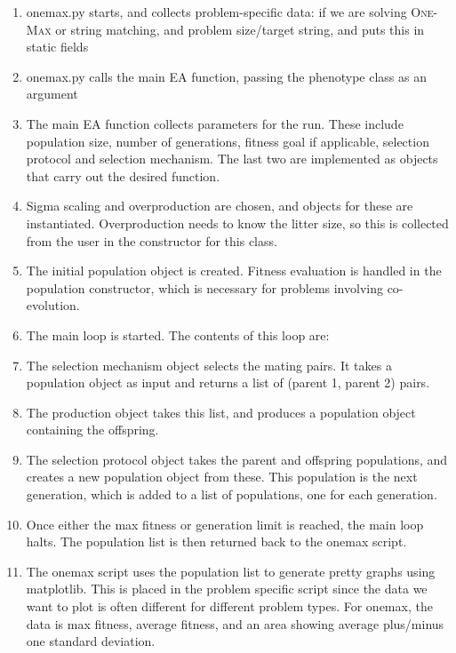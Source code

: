 \documentclass[a4paper,12pt]{article}
\begin{document}
\begin{enumerate}
\item{onemax.py starts, and collects problem-specific data: if we are solving \textsc{One-Max} or string matching, and problem size/target string, and puts this in static fields}
\item{onemax.py calls the main EA function, passing the phenotype class as an argument}
\item{The main EA function collects parameters for the run. These include population size, number of generations, fitness goal if applicable, selection protocol and selection mechanism. The last two are implemented as objects that carry out the desired function.}
\item{Sigma scaling and overproduction are chosen, and objects for these are instantiated. Overproduction needs to know the litter size, so this is collected from the user in the constructor for this class.}
\item{The initial population object is created. Fitness evaluation is handled in the population constructor, which is necessary for problems involving co-evolution.}
\item{The main loop is started. The contents of this loop are:}
\item{The selection mechanism object selects the mating pairs. It takes a population object as input and returns a list of (parent 1, parent 2) pairs.}
\item{The production object takes this list, and produces a population object containing the offspring.}
\item{The selection protocol object takes the parent and offspring populations, and creates a new population object from these. This population is the next generation, which is added to a list of populations, one for each generation.}
\item{Once either the max fitness or generation limit is reached, the main loop halts. The population list is then returned back to the onemax script.}
\item{The onemax script uses the population list to generate pretty graphs using matplotlib. This is placed in the problem specific script since the data we want to plot is often different for different problem types. For onemax, the data is max fitness, average fitness, and an area showing average plus/minus one standard deviation.}
\end{enumerate}
\end{document}
